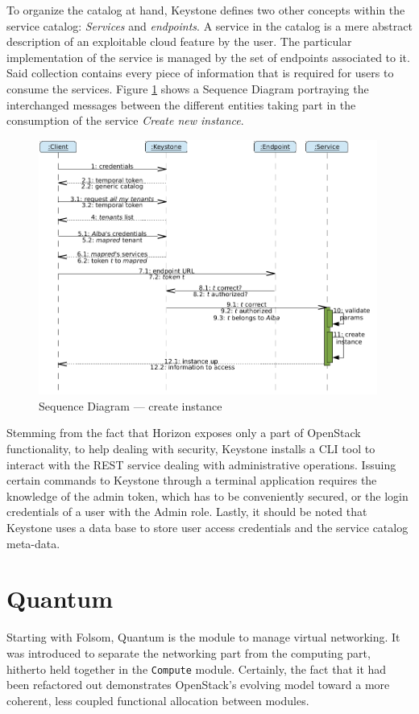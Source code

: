 To organize the catalog at hand, Keystone defines two other concepts within the service catalog: \emph{Services} and \emph{endpoints}. A service in the catalog is a mere abstract description of an exploitable cloud feature by the user. The particular implementation of the service is managed by the set of endpoints associated to it. Said collection contains every piece of information that is required for users to consume the services. Figure \ref{fig:secuenciais} shows a Sequence Diagram portraying the interchanged messages between the different entities taking part in the consumption of the service \emph{Create new instance}.

\begin{figure}[tbp]
\begin{center}
\includegraphics[width=0.99\textwidth]{imagenes/013.pdf}
 \caption{Sequence Diagram --- create instance}
\label{fig:secuenciais}
\end{center}
\end{figure}

Stemming from the fact that Horizon exposes only a part of OpenStack functionality, to help dealing with security, Keystone installs a CLI tool to interact with the REST service dealing with administrative operations. Issuing certain commands to Keystone through a terminal application requires the knowledge of the admin token, which has to be conveniently secured, or the login credentials of a user with the Admin role. Lastly, it should be noted that Keystone uses a data base to store user access credentials and the service catalog meta-data.

\section{Quantum}\label{sec:quantum}
\noindent Starting with Folsom, Quantum is the module to manage virtual networking. It was introduced to separate the networking part from the computing part, hitherto held together in the \texttt{Compute} module. Certainly, the fact that it had been refactored out demonstrates OpenStack's evolving model toward a more coherent, less coupled functional allocation between modules.

